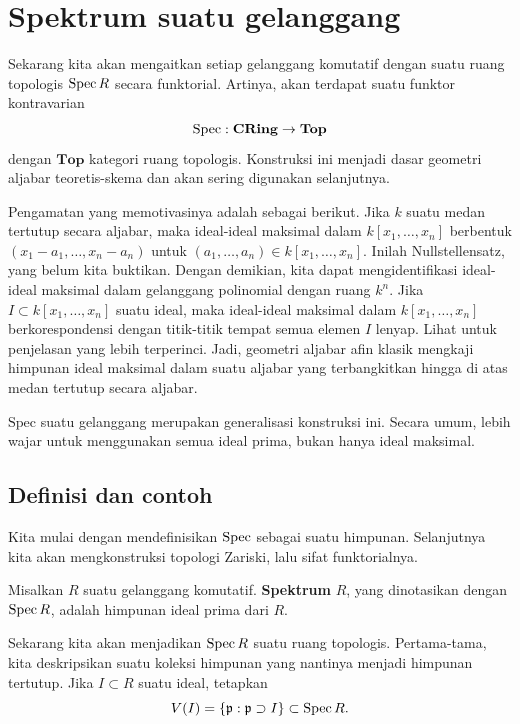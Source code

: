 \section{Spektrum suatu gelanggang}

Sekarang kita akan mengaitkan setiap gelanggang komutatif dengan suatu ruang
topologis $\operatorname{Spec} R$
secara funktorial.
Artinya, akan terdapat suatu funktor kontravarian
\[\operatorname{Spec}:  \mathbf{CRing} \to \mathbf{Top}  \]
dengan $\mathbf{Top}$ kategori ruang topologis.
Konstruksi ini menjadi dasar geometri aljabar
teoretis-skema dan akan sering digunakan selanjutnya. 

Pengamatan yang memotivasinya adalah sebagai berikut. Jika $k$ suatu
medan tertutup secara aljabar, maka ideal-ideal maksimal dalam $k[x_1, \dots, x_n]$ berbentuk
$(x_1-a_1, \dots, x_n  - a_n)$ untuk $(a_1, \dots, a_n) \in k[x_1, \dots, x_n]$.
Inilah Nullstellensatz, yang belum kita buktikan. Dengan demikian, kita dapat
mengidentifikasi ideal-ideal maksimal dalam gelanggang polinomial dengan ruang $k^n$.
Jika $I \subset k[x_1, \dots, x_n]$ suatu ideal, maka ideal-ideal maksimal dalam
$k[x_1,\dots,x_n]$ berkorespondensi dengan titik-titik tempat semua elemen $I$ lenyap. Lihat 
 untuk penjelasan yang lebih terperinci. Jadi, geometri aljabar afin klasik
mengkaji himpunan ideal maksimal dalam suatu aljabar yang terbangkitkan
hingga di atas medan tertutup secara aljabar.

$\mathrm{Spec}$ suatu gelanggang merupakan generalisasi konstruksi ini.
Secara umum, lebih wajar untuk 
menggunakan semua ideal prima, bukan hanya ideal maksimal.
\subsection{Definisi dan contoh}

Kita mulai dengan mendefinisikan $\operatorname{Spec}$ sebagai suatu himpunan. Selanjutnya kita akan
mengkonstruksi
topologi Zariski, lalu sifat funktorialnya.
\begin{definition} 
Misalkan $R$ suatu gelanggang komutatif. \textbf{Spektrum} $R$,
yang dinotasikan dengan $\operatorname{Spec} R$, adalah
himpunan ideal prima dari $R$.
\end{definition} 

Sekarang kita akan menjadikan $\operatorname{Spec} R$ suatu ruang topologis. Pertama-tama, kita
deskripsikan suatu
koleksi himpunan yang nantinya menjadi himpunan tertutup. 
Jika $I \subset R$ suatu ideal, tetapkan
\[ V(I) = \left\{\mathfrak{p}: \mathfrak{p} \supset I\right\}
\subset \operatorname{Spec} R.
\]

